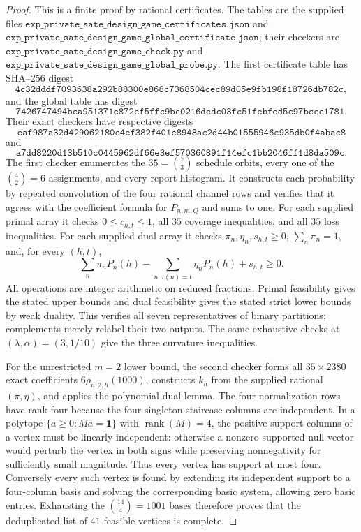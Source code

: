 \documentclass{article}
\begin{document}
\begin{proof}
This is a finite proof by rational certificates.  The tables are the supplied files \(\texttt{exp\_private\_sate\_design\_game\_certificates.json}\) and \(\texttt{exp\_private\_sate\_design\_game\_global\_certificate.json}\); their checkers are \(\texttt{exp\_private\_sate\_design\_game\_check.py}\) and \(\texttt{exp\_private\_sate\_design\_game\_global\_probe.py}\).  The first certificate table has SHA--256 digest
\[
 \texttt{4c32dddf7093638a292b88300e868c7368504cec89d05e9fb198f18726db782c},
\]
and the global table has digest
\[
 \texttt{7426747494bca951371e872ef5ffc9bc0216dedc03fc51febfed5c97bccc1781}.
\]
Their exact checkers have respective digests
\[
 \texttt{eaf987a32d429062180c4ef382f401e8948ac2d44b01555946c935db0f4abac8}
\]
and
\[
 \texttt{a7dd8220d13b510c0445962df66e3ef570360891f14efc1bb2046ff1d8da509c}.
\]
The first checker enumerates the \(35=\binom73\) schedule orbits, every one of the \(\binom42=6\) assignments, and every report histogram.  It constructs each probability by repeated convolution of the four rational channel rows and verifies that it agrees with the coefficient formula for \(P_{n,m,Q}\) and sums to one.  For each supplied primal array it checks \(0\le c_{h,t}\le1\), all \(35\) coverage inequalities, and all \(35\) loss inequalities.  For each supplied dual array it checks \(\pi_n,\eta_n,s_{h,t}\ge0\), \(\sum_n\pi_n=1\), and, for every \((h,t)\),
\[
 \sum_n\pi_nP_n(h)-\sum_{n:\tau(n)=t}\eta_nP_n(h)+s_{h,t}\ge0.
\]
All operations are integer arithmetic on reduced fractions.  Primal feasibility gives the stated upper bounds and dual feasibility gives the stated strict lower bounds by weak duality.  This verifies all seven representatives of binary partitions; complements merely relabel their two outputs.  The same exhaustive checks at \((\lambda,\alpha)=(3,1/10)\) give the three curvature inequalities.

For the unrestricted \(m=2\) lower bound, the second checker forms all \(35\times2380\) exact coefficients \(6\rho_{n,2,h}(1000)\), constructs \(k_h\) from the supplied rational \((\pi,\eta)\), and applies the polynomial-dual lemma.  The four normalization rows have rank four because the four singleton staircase columns are independent.  In a polytope \(\{a\ge0:Ma=\mathbf1\}\) with \(\operatorname{rank}(M)=4\), the positive support columns of a vertex must be linearly independent: otherwise a nonzero supported null vector would perturb the vertex in both signs while preserving nonnegativity for sufficiently small magnitude.  Thus every vertex has support at most four.  Conversely every such vertex is found by extending its independent support to a four-column basis and solving the corresponding basic system, allowing zero basic entries.  Exhausting the \(\binom{14}{4}=1001\) bases therefore proves that the deduplicated list of \(41\) feasible vertices is complete.


\end{proof}
\end{document}
